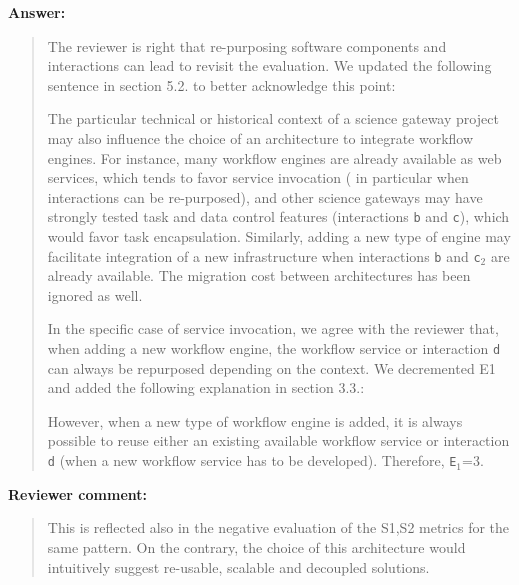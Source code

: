 \documentclass[a4]{article}
\newenvironment{review}%
{\textbf{Reviewer comment:}\begin{quote}}%
{\end{quote}}%
\newenvironment{answer}%
{\textbf{Answer:}\begin{small}\begin{quote}}%
{\end{quote}\end{small}}%
\newcommand{\revised}[1]{\color{blue} #1\color{black}\xspace}
\begin{document}
\begin{answer}

The reviewer is right that re-purposing software components
  and interactions can lead to revisit the evaluation. We updated the following sentence in section 5.2. to better acknowledge this point:

The particular technical or historical context of a science gateway
project may also influence the choice of an architecture to
integrate workflow engines. For instance, many workflow engines are
already available as web services, which tends to favor service
invocation (\revised{in particular when interactions can be re-purposed}), and other science gateways may have strongly tested task
and data control features (interactions \texttt{b} and \texttt{c}),
which would favor task encapsulation. Similarly, adding a new type of engine
may facilitate integration of a new infrastructure when interactions
\texttt{b} and \texttt{c$_2$} are already available. The migration
cost between architectures has been ignored as well.

In the specific case of service invocation, we agree with the reviewer
that, when adding a new workflow engine, the workflow service or interaction \texttt{d} can always be repurposed depending on the context. We decremented E1 and added the following explanation in section 3.3.:

\revised{However, when a new type of workflow engine is added, it is always possible to reuse either an existing available workflow service or interaction \texttt{d} (when a new workflow service has to be developed). Therefore, \texttt{E$_1$}=3}.
\end{answer}

\begin{review}
 This is reflected also in the negative evaluation of the S1,S2 metrics for the same pattern. On the contrary, the choice of this architecture would intuitively suggest re-usable, scalable and decoupled solutions.
\end{review}
\end{document}
